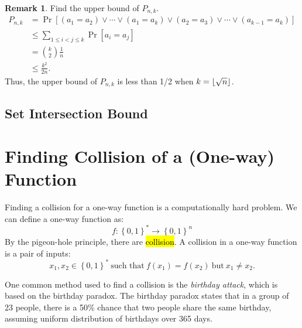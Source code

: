 \documentclass[12pt,openany]{book}
\DeclarePairedDelimiter{\floor}{\lfloor}{\rfloor}
\theoremstyle{definition}
\newtheorem{remark}{Remark}[chapter]
\newcommand{\set}[1]{\left\{#1\right\}}
\newcommand{\of}[1]{\left( #1 \right)}
\begin{document}
	\begin{remark}
		Find the upper bound of $P_{n,k}$. \begin{align*}
			P_{n,k}
			&=\Pr\left[(a_1=a_2)\lor\cdots\lor(a_1=a_k)\lor(a_2=a_3)\lor\cdots\lor(a_{k-1}=a_k)\right]\\
			&\leq\sum_{1\leq i< j\leq k}\Pr\left[a_i=a_j\right]\\
			&=\binom{k}{2}\frac{1}{n}\\
			&\leq\frac{k^2}{2n}.
		\end{align*} Thus, the upper bound of $P_{n,k}$ is less than 1/2 when $k=\floor*{\sqrt{n}}$.
	\end{remark}
	
	\subsection{Set Intersection Bound}
	
	\newpage
	\section{Finding Collision of a (One-way) Function}
	
	Finding a collision for a one-way function is a computationally hard problem. We can define a one-way function as:
	\[
	f : \set{0,1}^*\to \set{0,1}^n
	\] By the pigeon-hole principle, there are \hl{collision}. A collision in a one-way function is a pair of inputs:
	\[
	x_1,x_2\in\set{0,1}^*\ \text{such that}\ f\of{x_1}=f\of{x_2}\ \text{but}\ x_1\neq x_2.
	\]
	
	One common method used to find a collision is the \textit{birthday attack}, which is based on the birthday paradox. The birthday paradox states that in a group of 23 people, there is a 50\% chance that two people share the same birthday, assuming uniform distribution of birthdays over 365 days.
	
\end{document}
